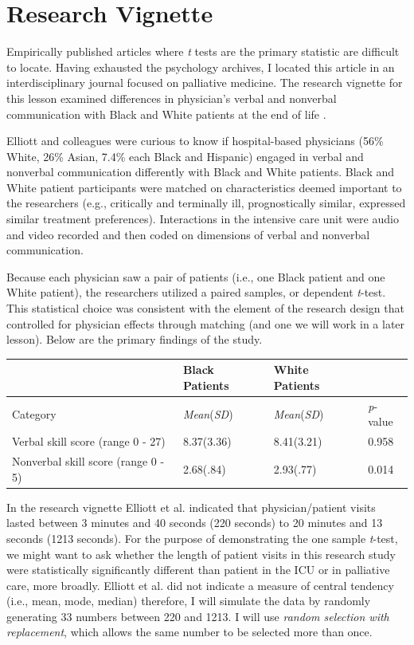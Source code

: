 \documentclass[
  11pt,
]{book}
\begin{document}
\hypertarget{research-vignette-1}{%
\section{Research Vignette}\label{research-vignette-1}}

Empirically published articles where \emph{t} tests are the primary statistic are difficult to locate. Having exhausted the psychology archives, I located this article in an interdisciplinary journal focused on palliative medicine. The research vignette for this lesson examined differences in physician's verbal and nonverbal communication with Black and White patients at the end of life \citep{elliott_differences_2016}.

Elliott and colleagues \citeyearpar{elliott_differences_2016} were curious to know if hospital-based physicians (56\% White, 26\% Asian, 7.4\% each Black and Hispanic) engaged in verbal and nonverbal communication differently with Black and White patients. Black and White patient participants were matched on characteristics deemed important to the researchers (e.g., critically and terminally ill, prognostically similar, expressed similar treatment preferences). Interactions in the intensive care unit were audio and video recorded and then coded on dimensions of verbal and nonverbal communication.

Because each physician saw a pair of patients (i.e., one Black patient and one White patient), the researchers utilized a paired samples, or dependent \emph{t}-test. This statistical choice was consistent with the element of the research design that controlled for physician effects through matching (and one we will work in a later lesson). Below are the primary findings of the study.

\begin{longtable}[]{@{}llll@{}}
\toprule()
& Black Patients & White Patients & \\
\midrule()
\endhead
Category & \emph{Mean}(\emph{SD}) & \emph{Mean}(\emph{SD}) & \emph{p}-value \\
Verbal skill score (range 0 - 27) & 8.37(3.36) & 8.41(3.21) & 0.958 \\
Nonverbal skill score (range 0 - 5) & 2.68(.84) & 2.93(.77) & 0.014 \\
\bottomrule()
\end{longtable}

In the research vignette Elliott et al. \citeyearpar{elliott_differences_2016} indicated that physician/patient visits lasted between 3 minutes and 40 seconds (220 seconds) to 20 minutes and 13 seconds (1213 seconds). For the purpose of demonstrating the one sample \emph{t}-test, we might want to ask whether the length of patient visits in this research study were statistically significantly different than patient in the ICU or in palliative care, more broadly. Elliott et al.\citeyearpar{elliott_differences_2016} did not indicate a measure of central tendency (i.e., mean, mode, median) therefore, I will simulate the data by randomly generating 33 numbers between 220 and 1213. I will use \emph{random selection with replacement}, which allows the same number to be selected more than once.
\end{document}
